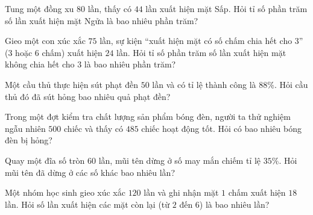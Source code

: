 \begin{ex} %
Tung một đồng xu $80$ lần, thấy có $44$ lần xuất hiện mặt Sấp. Hỏi tỉ số phần trăm số lần xuất hiện mặt Ngửa là bao nhiêu phần trăm?
\end{ex}

\begin{ex} %
Gieo một con xúc xắc $75$ lần, sự kiện “xuất hiện mặt có số chấm chia hết cho $3$” ($3$ hoặc $6$ chấm) xuất hiện $24$ lần. Hỏi tỉ số phần trăm số lần xuất hiện mặt không chia hết cho $3$ là bao nhiêu phần trăm?
\end{ex}

\begin{ex} %
Một cầu thủ thực hiện sút phạt đền $50$ lần và có tỉ lệ thành công là $88\%$. Hỏi cầu thủ đó đã sút hỏng bao nhiêu quả phạt đền?
\end{ex}

\begin{ex} %
Trong một đợt kiểm tra chất lượng sản phẩm bóng đèn, người ta thử nghiệm ngẫu nhiên $500$ chiếc và thấy có $485$ chiếc hoạt động tốt. Hỏi có bao nhiêu bóng đèn bị hỏng?
\end{ex}

\begin{ex} %
Quay một đĩa số tròn $60$ lần, mũi tên dừng ở số may mắn chiếm tỉ lệ $35\%$. Hỏi mũi tên đã dừng ở các số khác bao nhiêu lần?
\end{ex}

\begin{ex} %
Một nhóm học sinh gieo xúc xắc $120$ lần và ghi nhận mặt $1$ chấm xuất hiện $18$ lần. Hỏi số lần xuất hiện các mặt còn lại (từ $2$ đến $6$) là bao nhiêu lần?
\end{ex}
